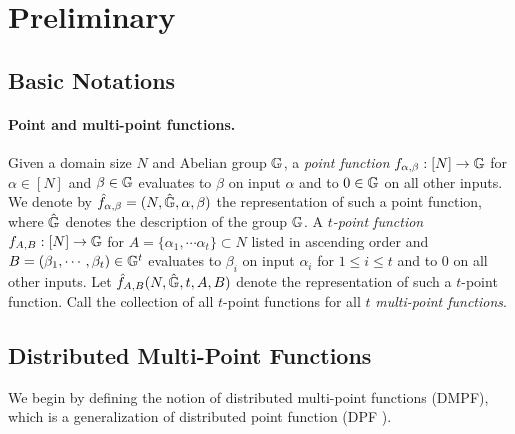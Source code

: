 \section{Preliminary}
\subsection{Basic Notations}
\paragraph{Point and multi-point functions.} Given a domain size $N$ and Abelian group $\mathbb{G}$, a \emph{point function} $f_{\alpha,\beta}:[N]\rightarrow\mathbb{G}$ for $\alpha\in[N]$ and $\beta\in\mathbb{G}$ evaluates to $\beta$ on input $\alpha$ and to $0\in\mathbb{G}$ on all other inputs. We denote by $\hat{f}_{\alpha,\beta}=(N,\hat{\mathbb{G}},\alpha,\beta)$ the representation of such a point function, where $\hat{\mathbb{G}}$ denotes the description of the group $\mathbb{G}$. A \emph{$t$-point function} $f_{A,B}:[N]\rightarrow \mathbb{G}$ for $A=\{\alpha_1,\cdots\alpha_t\}\subset N$ listed in ascending order and $B=(\beta_1,\cdots,\beta_t)\in \mathbb{G}^t$ evaluates to $\beta_i$ on input $\alpha_i$ for $1\le i\le t$ and to $0$ on all other inputs. Let $\hat{f}_{A,B}(N,\hat{\mathbb{G}},t,A,B)$ denote the representation of such a $t$-point function. Call the collection of all $t$-point functions for all $t$ \emph{multi-point functions}. 
 
\subsection{Distributed Multi-Point Functions}

We begin by defining the notion of distributed multi-point functions (DMPF), which is a generalization of distributed point function (DPF \cite{10.1007/978-3-662-46803-6_12,CCS:BoyGilIsh16}). %


